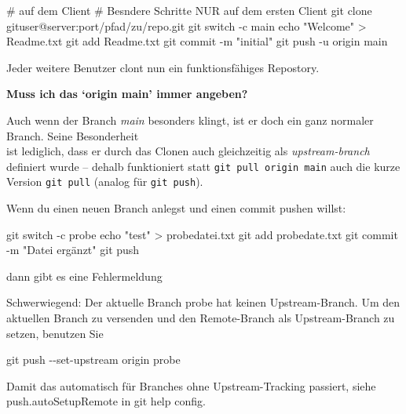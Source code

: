 \documentclass[
  letterpaper,
  DIV=11]{scrreprt}
\newenvironment{Shaded}{\begin{snugshade}}{\end{snugshade}}
\newcommand{\AttributeTok}[1]{\textcolor[rgb]{0.40,0.45,0.13}{#1}}
\newcommand{\BuiltInTok}[1]{\textcolor[rgb]{0.00,0.23,0.31}{#1}}
\newcommand{\CommentTok}[1]{\textcolor[rgb]{0.37,0.37,0.37}{#1}}
\newcommand{\ExtensionTok}[1]{\textcolor[rgb]{0.00,0.23,0.31}{#1}}
\newcommand{\FunctionTok}[1]{\textcolor[rgb]{0.28,0.35,0.67}{#1}}
\newcommand{\NormalTok}[1]{\textcolor[rgb]{0.00,0.23,0.31}{#1}}
\newcommand{\OperatorTok}[1]{\textcolor[rgb]{0.37,0.37,0.37}{#1}}
\newcommand{\StringTok}[1]{\textcolor[rgb]{0.13,0.47,0.30}{#1}}
\newcommand{\cmd}[1]{\texttt{#1}\xspace}
\newcommand{\branch}[1]{\textit{#1}\xspace}
\begin{document}
\begin{Shaded}
\begin{Highlighting}[]
\CommentTok{\# auf dem Client}
\CommentTok{\# Besndere Schritte NUR auf dem ersten Client}
\FunctionTok{git}\NormalTok{ clone gituser@server:port/pfad/zu/repo.git }
\FunctionTok{git}\NormalTok{ switch }\AttributeTok{{-}c}\NormalTok{ main }
\BuiltInTok{echo} \StringTok{"Welcome"} \OperatorTok{\textgreater{}}\NormalTok{ Readme.txt }
\FunctionTok{git}\NormalTok{ add Readme.txt }
\FunctionTok{git}\NormalTok{ commit }\AttributeTok{{-}m} \StringTok{"initial"}
\FunctionTok{git}\NormalTok{ push }\AttributeTok{{-}u}\NormalTok{ origin main }
\end{Highlighting}
\end{Shaded}

Jeder weitere Benutzer clont nun ein funktionsfähiges Repostory.

\textbf{Muss ich das `origin main' immer angeben?}

Auch wenn der Branch \branch{main} besonders klingt, ist er doch ein
ganz normaler Branch. Seine Besonderheit\\
ist lediglich, dass er durch das Clonen auch gleichzeitig als
\emph{upstream-branch} definiert wurde -- dehalb funktioniert statt
\cmd{git pull origin main} auch die kurze Version \cmd{git pull} (analog
für \cmd{git push}).

Wenn du einen neuen Branch anlegst und einen commit pushen willst:

\begin{Shaded}
\begin{Highlighting}[]
\FunctionTok{git}\NormalTok{ switch }\AttributeTok{{-}c}\NormalTok{ probe }
\BuiltInTok{echo} \StringTok{"test"} \OperatorTok{\textgreater{}}\NormalTok{ probedatei.txt }
\FunctionTok{git}\NormalTok{ add probedate.txt }
\FunctionTok{git}\NormalTok{ commit }\AttributeTok{{-}m} \StringTok{"Datei ergänzt"}
\FunctionTok{git}\NormalTok{ push }
\end{Highlighting}
\end{Shaded}

dann gibt es eine Fehlermeldung

\begin{Shaded}
\begin{Highlighting}[]
\ExtensionTok{Schwerwiegend:} 
\ExtensionTok{Der}\NormalTok{ aktuelle Branch probe hat keinen Upstream{-}Branch.}
\ExtensionTok{Um}\NormalTok{ den aktuellen Branch zu versenden und den Remote{-}Branch}
\ExtensionTok{als}\NormalTok{ Upstream{-}Branch zu setzen, benutzen Sie}

    \FunctionTok{git}\NormalTok{ push }\AttributeTok{{-}{-}set{-}upstream}\NormalTok{ origin probe}

\ExtensionTok{Damit}\NormalTok{ das automatisch für Branches ohne Upstream{-}Tracking passiert,}
\ExtensionTok{siehe} \StringTok{\textquotesingle{}push.autoSetupRemote\textquotesingle{}}\NormalTok{ in }\StringTok{\textquotesingle{}git help config\textquotesingle{}}\NormalTok{.}
\end{Highlighting}
\end{Shaded}
\end{document}

